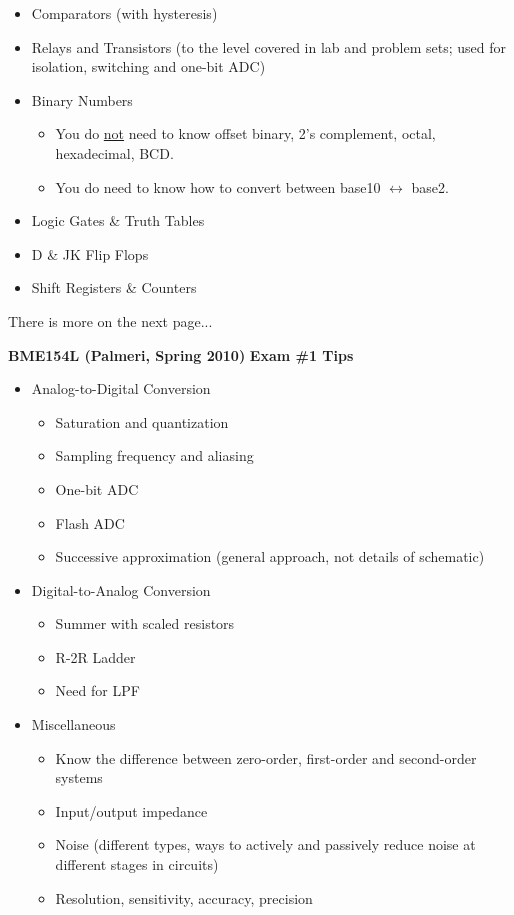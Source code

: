 \documentclass[11pt]{article}
\begin{document}
\begin{itemize}
\item Comparators (with hysteresis)

\item Relays and Transistors (to the level covered in lab and problem sets; used for isolation, switching and one-bit ADC)

\item Binary Numbers
\begin{itemize}
    \item You do \underline{not} need to know offset binary, 2's complement, octal, hexadecimal, BCD.
    \item You do need to know how to convert between base10 $\leftrightarrow$ base2.
\end{itemize}

\item Logic Gates \& Truth Tables

\item D \& JK Flip Flops

\item Shift Registers \& Counters
\end{itemize}

\hfill There is more on the next page...
\clearpage

{\bf BME154L (Palmeri, Spring 2010)} \hfill
{\bf Exam \#1 Tips}

\begin{itemize}
\item Analog-to-Digital Conversion
\begin{itemize}
    \item Saturation and quantization 
    \item Sampling frequency and aliasing
    \item One-bit ADC
    \item Flash ADC
    \item Successive approximation (general approach, not details of schematic)
\end{itemize}

\item Digital-to-Analog Conversion
\begin{itemize}
    \item Summer with scaled resistors
    \item R-2R Ladder
    \item Need for LPF
\end{itemize}

\item Miscellaneous
\begin{itemize}
    \item Know the difference between zero-order, first-order and second-order systems
    \item Input/output impedance
    \item Noise (different types, ways to actively and passively reduce noise at different stages in circuits)
    \item Resolution, sensitivity, accuracy, precision
\end{itemize}

\end{itemize}
\end{document}

